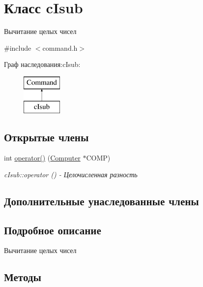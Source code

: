 \hypertarget{classc_isub}{}\section{Класс c\+Isub}
\label{classc_isub}


Вычитание целых чисел  




{\ttfamily \#include $<$command.\+h$>$}

Граф наследования\+:c\+Isub\+:\begin{figure}[H]
\begin{center}
\leavevmode
\includegraphics[height=2.000000cm]{classc_isub}
\end{center}
\end{figure}
\subsection*{Открытые члены}
\begin{DoxyCompactItemize}
\item 
int \hyperlink{classc_isub_ab4f6204ec8c69ce3342228c52fd30a05}{operator()} (\hyperlink{class_computer}{Computer} $\ast$C\+O\+MP)
\begin{DoxyCompactList}\small\item\em c\+Isub\+::operator () -\/ Целочисленная разность \end{DoxyCompactList}\end{DoxyCompactItemize}
\subsection*{Дополнительные унаследованные члены}


\subsection{Подробное описание}
Вычитание целых чисел 

\subsection{Методы}
\hypertarget{classc_isub_ab4f6204ec8c69ce3342228c52fd30a05}{}\label{classc_isub_ab4f6204ec8c69ce3342228c52fd30a05} 
